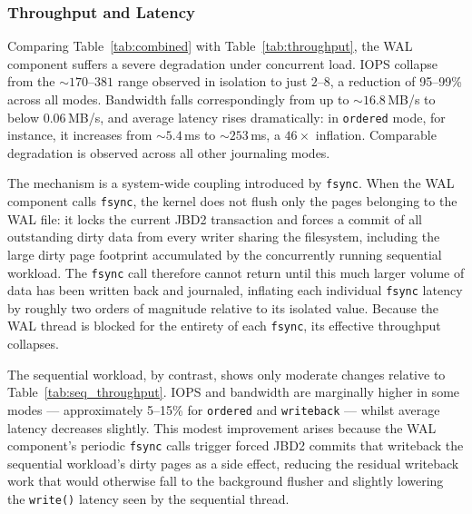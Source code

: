 \documentclass[12pt,a4paper]{article}
\begin{document}
\subsubsection{Throughput and Latency}
Comparing Table~\ref{tab:combined} with Table~\ref{tab:throughput}, the WAL component
suffers a severe degradation under concurrent load. IOPS collapse from the
${\sim}170$--$381$ range observed in isolation to just $2$--$8$, a reduction of
95--99\% across all modes. Bandwidth falls correspondingly from up to ${\sim}16.8$\,MB/s
to below $0.06$\,MB/s, and average latency rises dramatically: in \texttt{ordered}
mode, for instance, it increases from ${\sim}5.4$\,ms to ${\sim}253$\,ms, a
$46\times$ inflation. Comparable degradation is observed across all other journaling
modes.

The mechanism is a system-wide coupling introduced by \texttt{fsync}. When the WAL
component calls \texttt{fsync}, the kernel does not flush only the pages belonging to
the WAL file: it locks the current JBD2 transaction and forces a commit of all
outstanding dirty data from every writer sharing the filesystem, including the large
dirty page footprint accumulated by the concurrently running sequential workload. The
\texttt{fsync} call therefore cannot return until this much larger volume of data has
been written back and journaled, inflating each individual \texttt{fsync} latency by
roughly two orders of magnitude relative to its isolated value. Because the WAL thread
is blocked for the entirety of each \texttt{fsync}, its effective throughput collapses.

The sequential workload, by contrast, shows only moderate changes relative to
Table~\ref{tab:seq_throughput}. IOPS and bandwidth are marginally higher in some modes
--- approximately 5--15\% for \texttt{ordered} and \texttt{writeback} --- whilst
average latency decreases slightly. This modest improvement arises because the WAL
component's periodic \texttt{fsync} calls trigger forced JBD2 commits that writeback
the sequential workload's dirty pages as a side effect, reducing the residual writeback
work that would otherwise fall to the background flusher and slightly lowering the
\texttt{write()} latency seen by the sequential thread.
\end{document}
